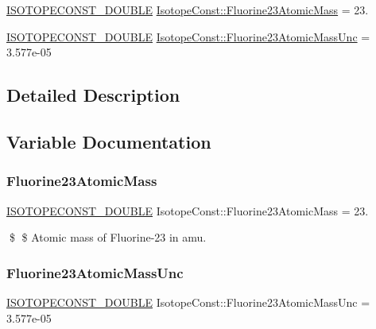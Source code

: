\begin{DoxyCompactItemize}
\item 
\mbox{\hyperlink{group___isotope_const-_macros_ga8f45a7272ce02c0b4c65c44636ed719a}{I\+S\+O\+T\+O\+P\+E\+C\+O\+N\+S\+T\+\_\+\+D\+O\+U\+B\+LE}} \mbox{\hyperlink{group___isotope_const-_fluorine-_f23_gafa16bc75a96ecd3f82311d05365e7c5b}{Isotope\+Const\+::\+Fluorine23\+Atomic\+Mass}} = 23.
\item 
\mbox{\hyperlink{group___isotope_const-_macros_ga8f45a7272ce02c0b4c65c44636ed719a}{I\+S\+O\+T\+O\+P\+E\+C\+O\+N\+S\+T\+\_\+\+D\+O\+U\+B\+LE}} \mbox{\hyperlink{group___isotope_const-_fluorine-_f23_ga3b579968d3191708ce7d2df4b6e2caea}{Isotope\+Const\+::\+Fluorine23\+Atomic\+Mass\+Unc}} = 3.\+577e-\/05
\end{DoxyCompactItemize}


\subsection{Detailed Description}


\subsection{Variable Documentation}
\mbox{\label{group___isotope_const-_fluorine-_f23_gafa16bc75a96ecd3f82311d05365e7c5b}} 
\subsubsection{\texorpdfstring{Fluorine23\+Atomic\+Mass}{Fluorine23AtomicMass}}
{\footnotesize\ttfamily \mbox{\hyperlink{group___isotope_const-_macros_ga8f45a7272ce02c0b4c65c44636ed719a}{I\+S\+O\+T\+O\+P\+E\+C\+O\+N\+S\+T\+\_\+\+D\+O\+U\+B\+LE}} Isotope\+Const\+::\+Fluorine23\+Atomic\+Mass = 23.}

\$ \$ Atomic mass of Fluorine-\/23 in amu. \mbox{\label{group___isotope_const-_fluorine-_f23_ga3b579968d3191708ce7d2df4b6e2caea}} 
\subsubsection{\texorpdfstring{Fluorine23\+Atomic\+Mass\+Unc}{Fluorine23AtomicMassUnc}}
{\footnotesize\ttfamily \mbox{\hyperlink{group___isotope_const-_macros_ga8f45a7272ce02c0b4c65c44636ed719a}{I\+S\+O\+T\+O\+P\+E\+C\+O\+N\+S\+T\+\_\+\+D\+O\+U\+B\+LE}} Isotope\+Const\+::\+Fluorine23\+Atomic\+Mass\+Unc = 3.\+577e-\/05}

